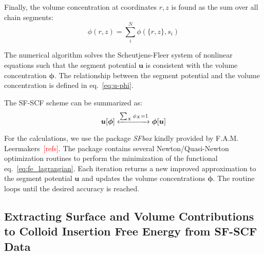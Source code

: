 \documentclass[10pt, a4paper]{article}
\newcommand\todo[1]{\textcolor{red}{#1}}
\begin{document}
\begin{multicols}{2}
Finally, the volume concentration at coordinates $r, z$ is found as the sum over all chain segments:
\begin{equation}
    \phi(r, z) = \sum_{i}^{N} \phi(\{r, z\}, s_i)
\end{equation}

The numerical algorithm solves the Scheutjens-Fleer system of nonlinear equations such that the segment potential $\mathbf{u}$ is consistent with the volume concentration $\boldsymbol{\phi}$.
The relationship between the segment potential and the volume concentration is defined in eq.~\ref{eq:u-phi}.

The SF-SCF scheme can be summarized as:
\begin{equation}
    \boldsymbol{u}[\boldsymbol{\phi}] \xleftrightarrow[]{\sum_{X} \phi_X = 1} \boldsymbol{\phi}[\boldsymbol{u}]
\end{equation}

For the calculations, we use the package \emph{SFbox} kindly provided by F.A.M. Leermakers~\todo{[refs]}.
The package contains several Newton/Quasi-Newton optimization routines to perform the minimization of the functional eq.~\ref{eq:fe_lagrangian}.
Each iteration returns a new improved approximation to the segment potential $\mathbf{u}$ and updates the volume concentrations $\mathbf{\phi}$.
The routine loops until the desired accuracy is reached.

\end{multicols}

\subsection*{Extracting Surface and Volume Contributions to Colloid Insertion Free Energy from SF-SCF Data}
\end{document}
